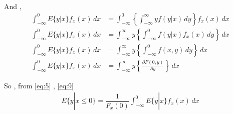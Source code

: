 \documentclass{beamer}
\providecommand{\cbrak}[1]{\ensuremath{\left\{#1\right\}}}
\begin{document}
    
    \begin{frame}{}
    And ,
        \begin{align}
            \int_{-\infty}^{0} E\{y|x\}f_x(x) \,dx &= \int_{-\infty}^{0} \cbrak{\int_{-\infty}^{\infty} y f(y|x)\,dy} f_x(x)\,dx \\[10pt]
            \int_{-\infty}^{0} E\{y|x\}f_x(x) \,dx &= \int_{-\infty}^{\infty} y \cbrak{\int_{-\infty}^{0} f(y|x)f_x(x)\,dy} \,dx \\[10pt]
            \int_{-\infty}^{0} E\{y|x\}f_x(x) \,dx &= \int_{-\infty}^{\infty} y \cbrak{\int_{-\infty}^{0} f(x,y) \,dy }\,dx \\[10pt]
            \int_{-\infty}^{0} E\{y|x\}f_x(x) \,dx &= \int_{-\infty}^{\infty} y \cbrak{\frac{\partial F(0,y)}{\partial y}} \,dx
            \label{eq:9}
        \end{align}
    \end{frame}
    
    \begin{frame}{}
    So ,  from \eqref{eq:5} , \eqref{eq:9}
        \begin{align}
            E\{y|x \le 0\} = \dfrac{1}{F_x(0)} \int_{-\infty}^{0} E\{y|x\}f_x(x) \,dx
        \end{align}
    \end{frame}
\end{document}
